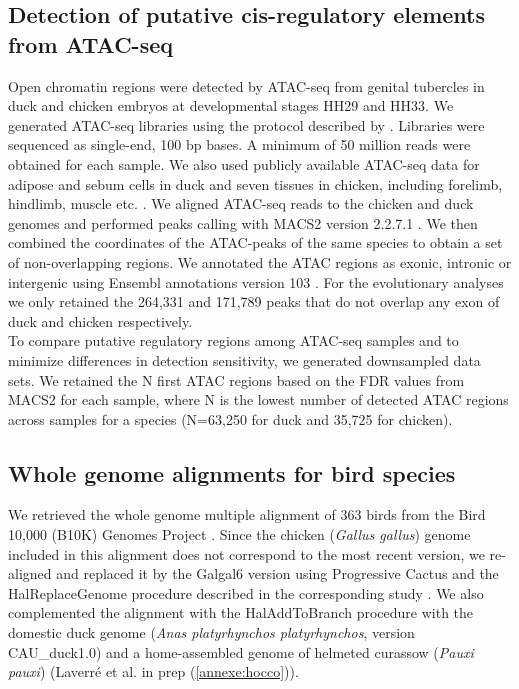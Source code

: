 \subsection*{Detection of putative \gls{cis}-regulatory elements from ATAC-seq}
Open chromatin regions were detected by ATAC-seq from genital tubercles in duck and chicken embryos at developmental stages HH29 and HH33. We generated ATAC-seq libraries using the protocol described by \citet{buenrostro_transposition_2013}. Libraries were sequenced as single-end, 100 bp bases. A minimum of 50 million reads were obtained for each sample. We also used publicly available ATAC-seq data for adipose and sebum cells in duck \citep{zhu_three_2021} and seven tissues in chicken, including forelimb, hindlimb, muscle etc. \citep{sackton_convergent_2019}. We aligned ATAC-seq reads to the chicken and duck genomes and performed peaks calling with MACS2 version 2.2.7.1 \citep{zhang_model-based_2008}. 
We then combined the coordinates of the ATAC-peaks of the same species to obtain a set of non-overlapping regions. 
We annotated the ATAC regions as exonic, intronic or intergenic using Ensembl annotations version 103 \citep{cunningham_ensembl_2019}. For the evolutionary analyses we only retained the 264,331 and 171,789 peaks that do not overlap any exon of duck and chicken respectively.\\

To compare putative regulatory regions among ATAC-seq samples and to minimize differences in detection sensitivity, we generated downsampled data sets. We retained the N first ATAC regions based on the FDR values from MACS2 for each sample, where N is the lowest number of detected ATAC regions across samples for a species (N=63,250 for duck and 35,725 for chicken).

\subsection*{Whole genome alignments for bird species}
We retrieved the whole genome multiple alignment of 363 birds from the Bird 10,000 (B10K) Genomes Project \citep{feng_dense_2020}. Since the chicken (\textit{Gallus gallus}) genome included in this alignment does not correspond to the most recent version, we re-aligned and replaced it by the Galgal6 version using Progressive Cactus and the HalReplaceGenome procedure described in the corresponding study \citep{armstrong_progressive_2020}. We also complemented the alignment with the HalAddToBranch procedure with the domestic duck genome (\textit{Anas platyrhynchos platyrhynchos}, version CAU\_duck1.0) and a home-assembled genome of helmeted curassow (\textit{Pauxi pauxi}) (Laverré et al. in prep (\ref{annexe:hocco})). 


